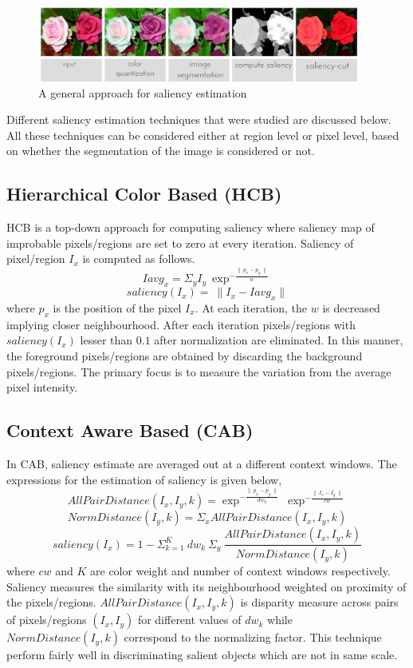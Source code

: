 \begin{figure}[htpb]
   \begin{center}
	    \includegraphics[width=0.95\textwidth]{snaps/sal/saliency.eps}     
     \caption {A general approach for saliency estimation}
   \label{fig:salap}
   \end{center}
 \end{figure}

\par Different saliency estimation techniques that were studied are discussed below. All these techniques can be considered either at region level or pixel level, based on whether the segmentation of the image is considered or not.

\subsection{Hierarchical Color Based (HCB)}
HCB is a top-down approach for computing saliency where saliency map of improbable pixels/regions are set to zero at every iteration. Saliency of pixel/region $I_{x}$ is computed as follows. 
$$ Iavg_{x} = \Sigma_{y} I_{y}~\exp^{-\frac{\parallel~p_{x} - p_{y}~\parallel}{w}}  $$
$$ saliency(I_{x}) =~\parallel I_{x} - Iavg_{x} \parallel $$
where $p_{x}$ is the position of the pixel $I_{x}$. At each iteration, the $w$ is decreased implying closer neighbourhood. After each iteration pixels/regions with $ saliency(I_{x})$ lesser than $0.1$ after normalization are eliminated. In this manner, the foreground pixels/regions are obtained by discarding the background pixels/regions. The primary focus is to measure the variation from the average pixel intensity.

\subsection{Context Aware Based (CAB)}
In CAB, saliency estimate are averaged out at a different context windows. The expressions for the estimation of saliency is given below,
$$ AllPairDistance(I_{x},I_{y},k) = \exp^{-\frac{\parallel~p_x - p_y~\parallel}{dw_k}}~\exp^{-\frac{\parallel~I_{x} - I_{y}~\parallel}{cw}}$$
$$ NormDistance(I_{y},k) = \Sigma_{x} AllPairDistance(I_{x},I_{y},k)$$
$$ saliency(I_{x}) = 1- \Sigma^{K}_{k=1}~dw_{k}~\Sigma_{y}~\frac{AllPairDistance(I_{x},I_{y},k)}{NormDistance(I_{y},k)}$$
where $cw$ and $K$ are color weight and number of context windows respectively. Saliency measures the similarity with its neighbourhood weighted on proximity of the pixels/regions. $AllPairDistance(I_{x},I_{y},k)$ is disparity measure across pairs of pixels/regions $(I_{x},I_{y})$ for different values of $dw_{k}$ while $NormDistance(I_{y},k)$ correspond to the normalizing factor.
This technique perform fairly well in discriminating salient objects which are not in same scale.

